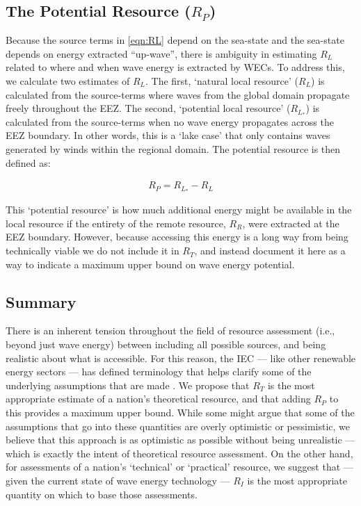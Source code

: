 \subsection{The Potential Resource ($R_P$)}

Because the source terms in \eqref{eqn:RL} depend on the sea-state and the sea-state depends on energy extracted ``up-wave'', there is ambiguity in estimating $R_L$ related to where and when wave energy is extracted by WECs. To address this, we calculate two estimates of $R_L$. The first, `natural local resource' ($R_L$) is calculated from the source-terms where waves from the global domain propagate freely throughout the EEZ. The second, `potential local resource' ($R_{L_*}$) is calculated from the source-terms when no wave energy propagates across the EEZ boundary. In other words, this is a `lake case' that only contains waves generated by winds within the regional domain. The potential resource is then defined as:

\begin{align}
    R_P = R_{L_*} - R_L
\end{align}

This `potential resource' is how much additional energy might be available in the local resource if the entirety of the remote resource, $R_R$, were extracted at the EEZ boundary. However, because accessing this energy is a long way from being technically viable we do not include it in $R_T$, and instead document it here as a way to indicate a maximum upper bound on wave energy potential.

\subsection{Summary}

There is an inherent tension throughout the field of resource assessment (i.e., beyond just wave energy) between including all possible sources, and being realistic about what is accessible. For this reason, the IEC — like other renewable energy sectors — has defined terminology that helps clarify some of the underlying assumptions that are made \citep[][]{internationalelectrotechnicalcommissionPartTerminologyEdition2020}. We propose that $R_T$ is the most appropriate estimate of a nation's theoretical resource, and that adding $R_P$ to this provides a maximum upper bound. While some might argue that some of the assumptions that go into these quantities are overly optimistic or pessimistic, we believe that this approach is as optimistic as possible without being unrealistic — which is exactly the intent of theoretical resource assessment.  On the other hand, for assessments of a nation's `technical' or `practical' resource, we suggest that — given the current state of wave energy technology — $R_I$ is the most appropriate quantity on which to base those assessments.

